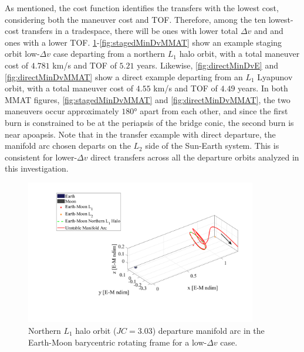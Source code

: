 As mentioned, the cost function identifies the transfers with the lowest cost, considering both the
maneuver cost and TOF. Therefore, among the ten lowest-cost transfers in a tradespace, there will
be ones with lower total $\Delta v$ and and ones with a lower TOF.
\cref{fig:stagedMinDvEM}-\cref{fig:stagedMinDvMMAT} show an example staging orbit low-$\Delta v$
case departing from a northern $L_{1}$ halo orbit, with a total maneuver cost of $4.781$ km/s and
TOF of $5.21$ years. Likewise, \cref{fig:directMinDvE} and \cref{fig:directMinDvMMAT} show a direct
example departing from an $L_{1}$ Lyapunov orbit, with a total maneuver cost of $4.55$ km/s and TOF
of $4.49$ years. In both MMAT figures, \cref{fig:stagedMinDvMMAT} and \cref{fig:directMinDvMMAT},
the two maneuvers occur approximately $\ang{180}$ apart from each other, and since the first burn
is constrained to be at the periapsis of the bridge conic, the second burn is near apoapsis. Note
that in the transfer example with direct departure, the manifold arc chosen departs on the $L_{2}$
side of the Sun-Earth system. This is consistent for lower-$\Delta v$ direct transfers across all
the departure orbits analyzed in this investigation.

\begin{figure}[!htb]
    \centering
    \includegraphics[width=0.9\textwidth]{figures/StagedMinDvEM.pdf}
    \caption{Northern $L_{1}$ halo orbit ($JC=3.03$) departure manifold arc in the Earth-Moon barycentric rotating frame for a low-$\Delta v$ case.}
    \label{fig:stagedMinDvEM}
\end{figure}

